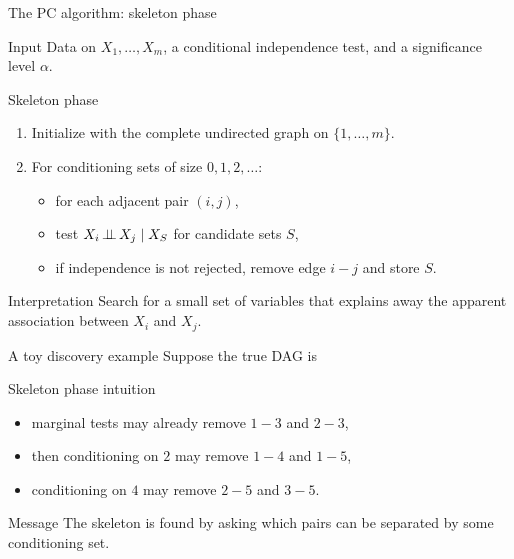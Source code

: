 \documentclass[dvipsnames,aspectratio=169,handout]{beamer}
\begin{document}
\begin{frame}{The PC algorithm: skeleton phase}
\begin{block}{Input}
Data on $X_1,\dots,X_m$, a conditional independence test, and a significance level $\alpha$.
\end{block}

\begin{block}{Skeleton phase}
\begin{enumerate}
    \item Initialize with the complete undirected graph on $\{1,\dots,m\}$.
    \item For conditioning sets of size $0,1,2,\dots$:
    \begin{itemize}
        \item for each adjacent pair $(i,j)$,
        \item test $X_i \mbox{\,$\perp\!\!\!\perp$\,} X_j \mid X_S$ for candidate sets $S$,
        \item if independence is not rejected, remove edge $i-j$ and store $S$.
    \end{itemize}
\end{enumerate}
\end{block}

\begin{alertblock}{Interpretation}
Search for a small set of variables that explains away the apparent association between $X_i$ and $X_j$.
\end{alertblock}
\end{frame}

\begin{frame}{A toy discovery example}
Suppose the true DAG is
\begin{center}
\end{center}

\begin{block}{Skeleton phase intuition}
\begin{itemize}
    \item marginal tests may already remove $1-3$ and $2-3$,
    \item then conditioning on $2$ may remove $1-4$ and $1-5$,
    \item conditioning on $4$ may remove $2-5$ and $3-5$.
\end{itemize}
\end{block}

\begin{alertblock}{Message}
The skeleton is found by asking which pairs can be separated by some conditioning set.
\end{alertblock}
\end{frame}
\end{document}
